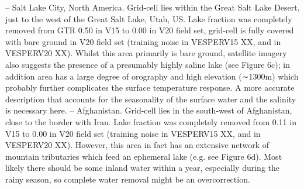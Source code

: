 \documentclass[hess, manuscript]{copernicus}
\begin{document}
– Salt Lake City, North America. Grid-cell lies within the Great Salt Lake Desert, just to the west of the Great Salt Lake, Utah, US. Lake fraction was completely removed from GTR 0.50 in V15 to 0.00 in V20 field set, grid-cell is fully covered with bare ground in V20 field set (training noise in VESPERV15 XX, and in VESPERV20 XX). Whilst this area primarily is bare ground, satellite imagery also suggests the presence of a presumably highly saline lake (see Figure 6c); in addition area has a large degree of orography and high elevation (∼1300m) which probably further complicates the surface temperature response. A more accurate description that accounts for the seasonality of the surface water and the salinity is necessary here.
– Afghanistan. Grid-cell lies in the south-west of Afghanistan, close to the border with Iran. Lake fraction was completely removed from 0.11 in V15 to 0.00 in V20 field set (training noise in VESPERV15 XX, and in VESPERV20 XX). However, this area in fact has an extensive network of mountain tributaries which feed an ephemeral lake (e.g. see Figure 6d). Most likely there should be some inland water within a year, especially during the rainy season, so complete water removal might be an overcorrection.
\end{document}
